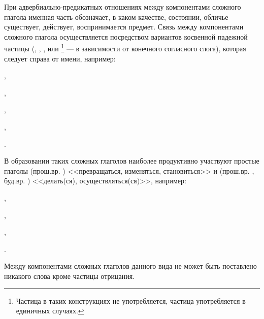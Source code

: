 При адвербиально-предикатных отношениях между компонентами сложного глагола именная часть обозначает, в каком качестве, состоянии, обличье существует, действует, воспринимается предмет. Связь между компонентами сложного глагола осуществляется посредством вариантов косвенной падежной частицы (, , ,  или \footnote[35]{Частица  в таких конструкциях не употребляется, частица  употребляется в единичных случаях.} --- в зависимости от конечного согласного слога), которая следует справа от имени, например:
\begin{prfsample}
	\item {},
	\item {},
	\item {},
	\item {},
	\item {}.
\end{prfsample}

В образовании таких сложных глаголов наиболее продуктивно участвуют простые глаголы  (прош.вр. ) <<превращаться, изменяться, становиться>> и (прош.вр. , буд.вр. ) <<делать(ся), осуществляться(ся)>>, например:
\begin{prfsample}
	\item {},
	\item {},
	\item {},
	\item {}.
\end{prfsample}

Между компонентами сложных глаголов данного вида не может быть поставлено никакого слова кроме частицы отрицания.

